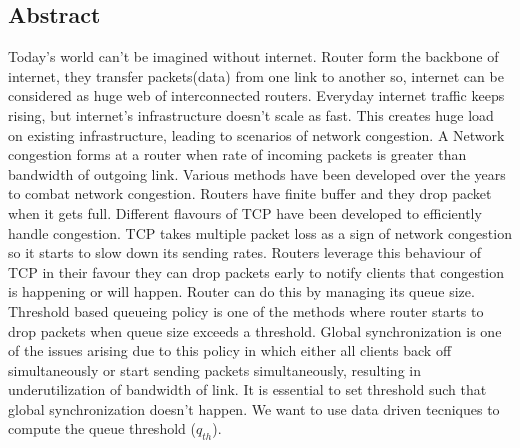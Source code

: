 \begin{flushright}
\huge{\section*{Abstract}}
\end{flushright}
Today's world can't be imagined without internet. Router form the backbone of internet, they transfer packets(data) from one link to another so, internet can be considered as huge web of interconnected routers. Everyday internet traffic keeps rising, but internet's infrastructure doesn't scale as fast. This creates huge load on existing infrastructure, leading to scenarios of network congestion. A Network congestion forms at a router when rate of incoming packets is greater than bandwidth of outgoing link. Various methods have been developed over the years to combat network congestion. Routers have finite buffer and they drop packet when it gets full. Different flavours of TCP have been developed to efficiently handle congestion. TCP takes multiple packet loss as a sign of network congestion so it starts to slow down its sending rates. Routers leverage this behaviour of TCP in their favour they can drop packets early to notify clients that congestion is happening or will happen. Router can do this by managing its queue size. Threshold based queueing policy is one of the methods where router starts to drop packets when queue size exceeds a threshold. Global synchronization is one of the issues arising due to this policy in which either all clients back off simultaneously or start sending packets simultaneously, resulting in underutilization of bandwidth of link. It is essential to set threshold such that global synchronization doesn't happen. We want to use data driven tecniques to compute the queue threshold ($ q_{th} $). 
